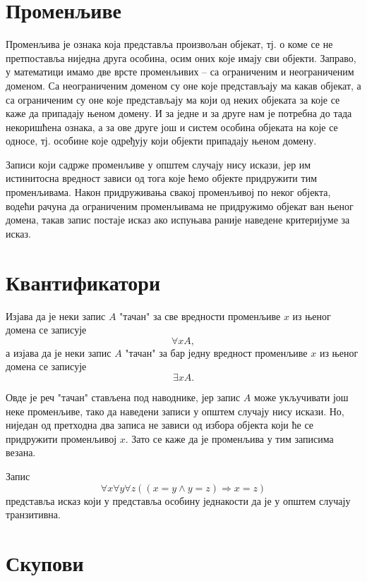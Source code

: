 \documentclass[a4paper]{book}
\newcommand{\tj}{\mbox{тј.} }
\begin{document}
\section{Променљиве}

\indent

Променљива је ознака која представља произвољан објекат, \tj о коме се не пре\-тпо\-ста\-вља ниједна друга особина,
осим оних које имају сви објекти. Заправо, у математици имамо две врсте променљивих -- са ограниченим и неограниченим
доменом.
Са неограниченим доменом су оне које представљају ма какав објекат, а са ограниченим су оне које пред\-ста\-вља\-ју ма који од
неких објеката за које се каже да припадају њеном домену.
И за једне и за друге нам је потребна до тада некоришћена ознака, а за ове друге још и систем особина објеката на које
се односе, \tj особине које одређују који објекти припадају њеном домену.

Записи који садрже променљиве у општем случају нису искази, јер им истинитосна вредност зависи од тога које ћемо
објекте придружити тим променљивама. Након при\-дру\-жи\-ва\-ња свакој променљивој по неког објекта, водећи рачуна да
ограниченим променљивама не придружимо објекат ван њеног домена, такав запис постаје исказ ако испуњава раније
наведене критеријуме за исказ.

\section{Квантификатори}

\indent

Изјава да је неки запис $A$ "тачан" за све вредности променљиве $x$ из њеног домена се записује
$$
\forall xA,
$$
а изјава да је неки запис $A$ "тачан" за бар једну вредност променљиве $x$ из њеног домена се записује
$$
\exists xA.
$$

Овде је реч "тачан" стављена под наводнике, јер запис $A$ може укључивати још неке променљиве, тако да наведени
записи у општем случају нису искази. Но, ниједан од прет\-хо\-дна два записа не зависи од избора објекта који ће се
придружити променљивој $x$. Зато се каже да је променљива у тим записима везана.

Запис
$$
\forall x\forall y\forall z((x=y\land y=z)\Rightarrow x=z)
$$
представља исказ који у представља особину једнакости да је у општем случају транзитивна.

\section{Скупови}
\end{document}
